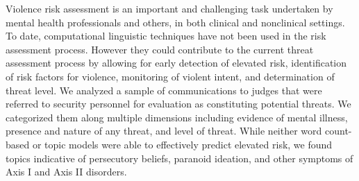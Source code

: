Violence risk assessment is an important and challenging task undertaken by mental health professionals and others, in both clinical and nonclinical settings. To date, computational linguistic techniques have not been used in the risk assessment process. However they could contribute to the current threat assessment process by allowing for early detection of elevated risk, identification of risk factors for violence, monitoring of violent intent, and determination of threat level. We analyzed a sample of communications to judges that were referred to security personnel for evaluation as constituting potential threats. We  categorized them along multiple dimensions including evidence of mental illness, presence and nature of any threat, and level of threat. While neither word count-based or topic models were able to effectively predict elevated risk, we found topics indicative of persecutory beliefs, paranoid ideation, and other symptoms of Axis I and Axis II disorders.
